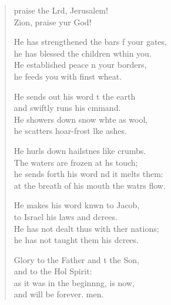 \settowidth{\versewidth}{He has strengthened the bars of your gates, *}
\begin{verse}%
  \begin{patverse}
     praise the Lrd, Jerusalem!\Med\\
    Zion, praise yur God!
    
    He has strengthened the bars f your gates,\Med\\
    he has blessed the children w\pointup{\i}thin you.\\
    He established peace n your borders,\Med\\
    he feeds you with finst wheat.
    
    He sends out his word t the earth\Med\\
    and swiftly runs his cmmand.\\
    He showers down snow wh\pointup{\i}te as wool,\Med\\
    he scatters hoar-frost l\pointup{\i}ke ashes.
    
    He hurls down hailstnes like crumbs.\Med\\
    The waters are frozen at h\pointup{\i}s touch;\\
    he sends forth his word nd it melts them:\Med\\
    at the breath of his mouth the watrs flow.
    
    He makes his word knwn to Jacob,\Med\\
    to Israel his laws and dcrees.\\
    He has not dealt thus with ther nations;\Med\\
    he has not taught them his dcrees.
    
    Glory to the Father and t the Son,\Med\\
    and to the Hol Spirit:\\
    as it was in the beginn\pointup{\i}ng, is now,\Med\\
    and will be forever. men.
  \end{patverse}
\end{verse}
